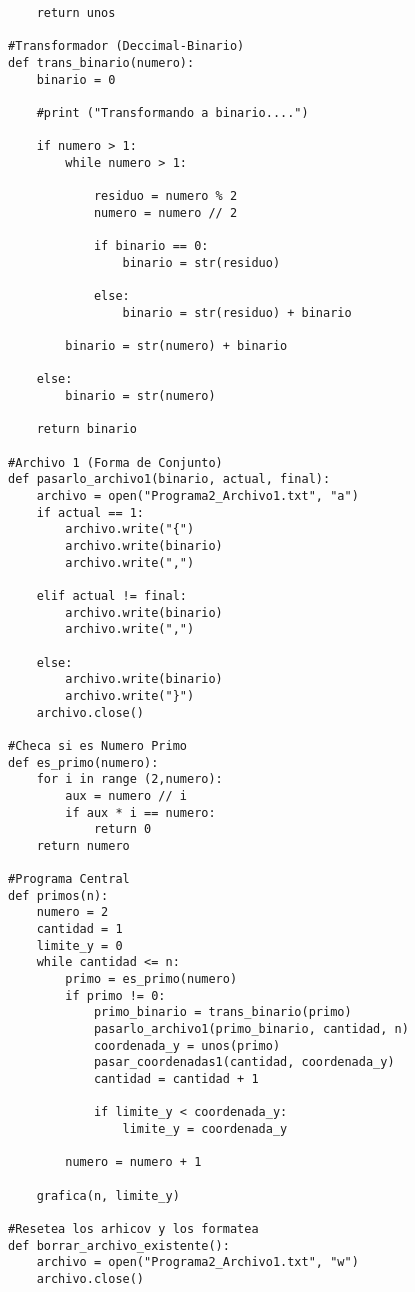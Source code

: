 \documentclass{article}
\begin{document}
\begin{flushleft}
\begin{lstlisting}
    return unos

#Transformador (Deccimal-Binario)
def trans_binario(numero):
    binario = 0

    #print ("Transformando a binario....")

    if numero > 1:
        while numero > 1:
                
            residuo = numero % 2
            numero = numero // 2
                
            if binario == 0:
                binario = str(residuo)
                    
            else:
                binario = str(residuo) + binario
        
        binario = str(numero) + binario
                
    else:
        binario = str(numero)
        
    return binario

#Archivo 1 (Forma de Conjunto)
def pasarlo_archivo1(binario, actual, final):
    archivo = open("Programa2_Archivo1.txt", "a")
    if actual == 1:
        archivo.write("{")
        archivo.write(binario)
        archivo.write(",")
        
    elif actual != final:
        archivo.write(binario)
        archivo.write(",")
    
    else:
        archivo.write(binario)
        archivo.write("}")
    archivo.close()

#Checa si es Numero Primo
def es_primo(numero):
    for i in range (2,numero):   
        aux = numero // i
        if aux * i == numero:
            return 0
    return numero

#Programa Central
def primos(n):
    numero = 2
    cantidad = 1
    limite_y = 0
    while cantidad <= n:
        primo = es_primo(numero)
        if primo != 0:
            primo_binario = trans_binario(primo)
            pasarlo_archivo1(primo_binario, cantidad, n)
            coordenada_y = unos(primo)
            pasar_coordenadas1(cantidad, coordenada_y)  
            cantidad = cantidad + 1
            
            if limite_y < coordenada_y:
                limite_y = coordenada_y
        
        numero = numero + 1
        
    grafica(n, limite_y)
            
#Resetea los arhicov y los formatea
def borrar_archivo_existente():
    archivo = open("Programa2_Archivo1.txt", "w")
    archivo.close()
    

\end{lstlisting}
\end{flushleft}
\end{document}
